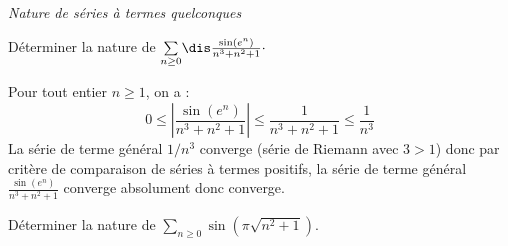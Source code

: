\documentclass[a4paper,10pt]{report}
\newcommand{\Sum}[2]{\ensuremath{\textstyle{\sum\limits_{#1}^{#2}}}}
\begin{document}
\medskip

\begin{center}
\textit{{ {\large Nature de séries à termes quelconques}}}
\end{center}

\medskip

\begin{Exa} Déterminer la nature de $\Sum{n \geq 0}{} \dis\frac{\sin(e^n)}{n^3+n^2+1} \cdot$
\end{Exa}

\corr Pour tout entier $n \geq 1$, on a :
\begin{equation}\label{ineg1}
0 \leq \left\vert \frac{\sin(e^n)}{n^3+n^2+1} \right\vert \leq \frac{1}{n^3+n^2+1} \leq \dfrac{1}{n^3}
\end{equation}
La série de terme général $1/n^3$ converge (série de Riemann avec $3>1$) donc par critère de comparaison de séries à termes positifs, la série de terme général $\frac{\sin(e^n)}{n^3+n^2+1}$ converge absolument donc converge.

\medskip

\begin{Exa} Déterminer la nature de $\Sum{n \geq 0}{} \sin \left({\pi \sqrt {n^2 + 1}} \right)$.
\end{Exa}
\end{document}
